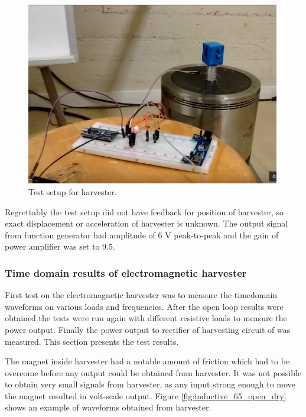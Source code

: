 \begin{figure}[htb]
\begin{center}
\includegraphics[height=8cm]{images/own_pic/shaker_setup/emh_shaker.png}
\end{center}
\caption{\label{fig:emh_shaker} Test setup for harvester.}
\end{figure}

Regrettably the test setup did not have feedback for position of harvester, so exact displacement or acceleration of harvester is unknown. The output signal from function generator had amplitude of 6 V peak-to-peak and the gain of power amplifier was set to 9.5.

\subsubsection{Time domain results of electromagnetic harvester}
First test on the electromagnetic harvester was to measure the timedomain waveforms on various loads and frequencies. After the open loop results were obtained the tests were run again with different resistive loads to measure the power output. Finally the power output to rectifier of harvesting circuit of was measured. This section presents the test results. 

The magnet inside harvester had a notable amount of friction which had to be overcome before any output could be obtained from harvester. It was not possible to obtain very small signals from harvester, as any input strong enough to move the magnet resulted in volt-scale output. Figure \ref{fig:inductive_65_open_dry} shows an example of waveforms obtained from harvester. 

